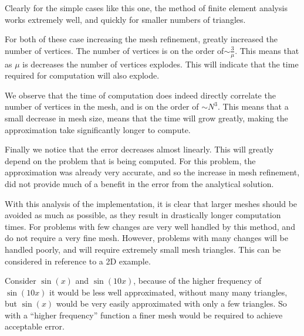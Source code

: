 \documentclass[../fem.tex]{subfile}
\begin{document}
Clearly for the simple cases like this one, the method of finite element
analysis works extremely well, and quickly for smaller numbers of triangles.

For both of these case increasing the mesh refinement, greatly increased the
number of vertices. The number of vertices is on the order
of$\sim\frac{3}{\mu}$. This means that as $\mu$ is decreases the number of
vertices explodes. This will indicate that the time required for computation
will also explode.

We observe that the time of computation does indeed directly correlate the
number of vertices in the mesh, and is on the order of $\sim N^3$. This means
that a small decrease in mesh size, means that the time will grow greatly,
making the approximation take significantly longer to compute.

Finally we notice that the error decreases almost linearly. This will greatly
depend on the problem that is being computed. For this problem, the
approximation was already very accurate, and so the increase in mesh
refinement, did not provide much of a benefit in the error from the analytical
solution.

With this analysis of the implementation, it is clear that larger meshes should
be avoided as much as possible, as they result in drastically longer computation
times. For problems with few changes are very well handled by this method, and
do not require a very fine mesh. However, problems with many changes will be
handled poorly, and will require extremely small mesh triangles. This can be
considered in reference to a 2D example.

Consider $\sin(x)$ and $\sin(10x)$, because of the higher frequency of
$\sin(10x)$ it would be less well approximated, without many many triangles,
but $\sin(x)$ would be very easily approximated with only a few triangles. So
with a ``higher frequency'' function a finer mesh would be required to achieve
acceptable error.
\end{document}
